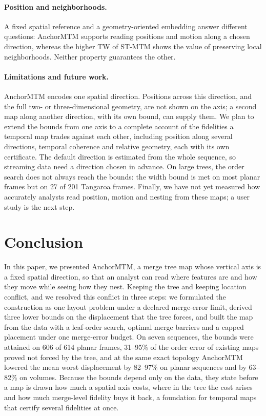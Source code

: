 \documentclass[preprint]{vgtc}   %
\begin{document}
\paragraph{Position and neighborhoods.} A fixed spatial reference and a geometry-oriented embedding answer different questions: AnchorMTM supports reading positions and motion along a chosen direction, whereas the higher TW of ST-MTM shows the value of preserving local neighborhoods. Neither property guarantees the other.

\paragraph{Limitations and future work.} AnchorMTM encodes one spatial direction. Positions across this direction, and the full two- or three-dimensional geometry, are not shown on the axis; a second map along another direction, with its own bound, can supply them. We plan to extend the bounds from one axis to a complete account of the fidelities a temporal map trades against each other, including position along several directions, temporal coherence and relative geometry, each with its own certificate. The default direction is estimated from the whole sequence, so streaming data need a direction chosen in advance. On large trees, the order search does not always reach the bounds: the width bound is met on most planar frames but on 27 of 201 Tangaroa frames. Finally, we have not yet measured how accurately analysts read position, motion and nesting from these maps; a user study is the next step.

\section{Conclusion}
In this paper, we presented AnchorMTM, a merge tree map whose vertical axis is a fixed spatial direction, so that an analyst can read where features are and how they move while seeing how they nest. Keeping the tree and keeping location conflict, and we resolved this conflict in three steps: we formulated the construction as one layout problem under a declared merge-error limit, derived three lower bounds on the displacement that the tree forces, and built the map from the data with a leaf-order search, optimal merge barriers and a capped placement under one merge-error budget. On seven sequences, the bounds were attained on 606 of 614 planar frames, 31--95\% of the order error of existing maps proved not forced by the tree, and at the same exact topology AnchorMTM lowered the mean worst displacement by 82--97\% on planar sequences and by 63--82\% on volumes. Because the bounds depend only on the data, they state before a map is drawn how much a spatial axis costs, where in the tree the cost arises and how much merge-level fidelity buys it back, a foundation for temporal maps that certify several fidelities at once.
\FloatBarrier
\begingroup
{}


\endgroup
\end{document}
